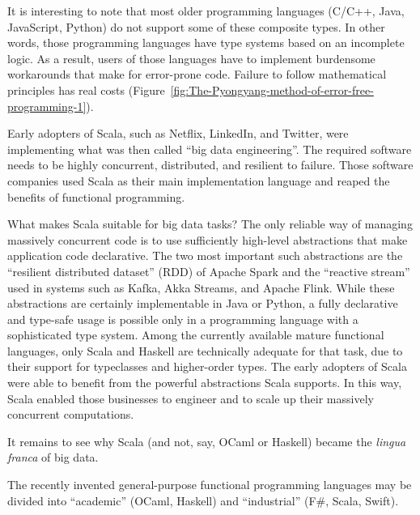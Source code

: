 It is interesting to note that most older programming languages (C/C++,
Java, JavaScript, Python) do not support some of these composite types.
In other words, those programming languages have type systems based
on an incomplete logic. As a result, users of those languages have
to implement burdensome workarounds that make for error-prone code.
Failure to follow mathematical principles has real costs (Figure~\ref{fig:The-Pyongyang-method-of-error-free-programming-1}).


Early adopters of Scala, such as Netflix, LinkedIn, and Twitter, were
implementing what was then called \textsf{``}big data engineering\textsf{''}. The
required software needs to be highly concurrent, distributed, and
resilient to failure. Those software companies used Scala as their
main implementation language and reaped the benefits of functional
programming.

What makes Scala suitable for big data tasks? The only reliable way
of managing massively concurrent code is to use sufficiently high-level
abstractions that make application code declarative. The two most
important such abstractions are the \textsf{``}resilient distributed dataset\textsf{''}
(RDD) of Apache Spark and the \textsf{``}reactive stream\textsf{''} used in systems
such as Kafka, Akka Streams, and Apache Flink. While these abstractions
are certainly implementable in Java or Python, a fully declarative
and type-safe usage is possible only in a programming language with
a sophisticated type system. Among the currently available mature
functional languages, only Scala and Haskell are technically adequate
for that task, due to their support for typeclasses and higher-order
types. The early adopters of Scala were able to benefit from the powerful
abstractions Scala supports. In this way, Scala enabled those businesses
to engineer and to scale up their massively concurrent computations.

It remains to see why Scala (and not, say, OCaml or Haskell) became
the \emph{lingua franca} of big data.


The recently invented general-purpose functional programming languages
may be divided into \textsf{``}academic\textsf{''} (OCaml, Haskell) and \textsf{``}industrial\textsf{''}
(F\#, Scala, Swift).

